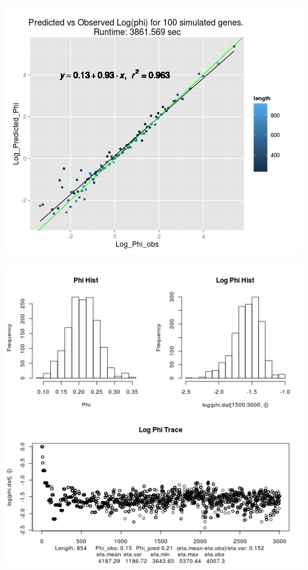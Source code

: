\documentclass{article}
\begin{document}
		\includegraphics[scale=0.5]{../chosen_100/3000_steps/BIS10/reflnorm_prop/phistart-1/Rplot.jpeg}
		
		\includegraphics[scale=0.5]{../chosen_100/3000_steps/BIS10/reflnorm_prop/phistart-1/hist/7_phi_hist.png}
		
\end{document}
